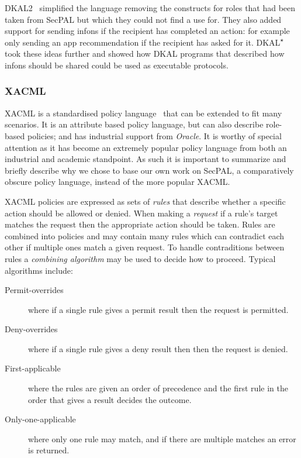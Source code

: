 \documentclass[thesis.tex]{subfiles}
\begin{document}
DKAL2~\cite{yuri_gurevich_dkal2---simplified_2009} simplified the
language removing the constructs for roles that had been taken from
SecPAL but which they could not find a use for.  They also added
support for sending infons if the recipient has completed an action:
for example only sending an app recommendation if the recipient has
asked for it.
DKAL\textsuperscript{$\star$}~\cite{jeannin_dkal*:_2013} took these
ideas further and showed how DKAL programs that described how infons
should be shared could be used as executable protocols.

\subsubsection{XACML}

XACML is a standardised policy language~\cite{oasis_extensible_2013}
that can be extended to fit many scenarios. It is an attribute based
policy language, but can also describe role-based policies; and has
industrial support from \emph{Oracle}.  It is worthy of special
attention as it has become an extremely popular policy language from
both an industrial and academic standpoint.  As such it is important
to summarize and briefly describe why we chose to base our own work on
SecPAL, a comparatively obscure policy language, instead of the more
popular XACML.

XACML policies are expressed as sets of \emph{rules} that describe
whether a specific action should be allowed or denied. When making a
\emph{request} if a rule's target matches the request then the
appropriate action should be taken. Rules are combined into policies
and may contain many rules which can contradict each other if multiple
ones match a given request. To handle contraditions between rules a
\emph{combining algorithm} may be used to decide how to
proceed. Typical algorithms include:

\begin{description}
  \item[Permit-overrides] where if a single rule gives a permit result then the request is permitted.
  \item[Deny-overrides] where if a single rule gives a deny result then then the request is denied.
  \item[First-applicable] where the rules are given an order of precedence and the first rule in the order that gives a result decides the outcome.
  \item[Only-one-applicable] where only one rule may match, and if there are multiple matches an error is returned.
\end{description}
\end{document}
